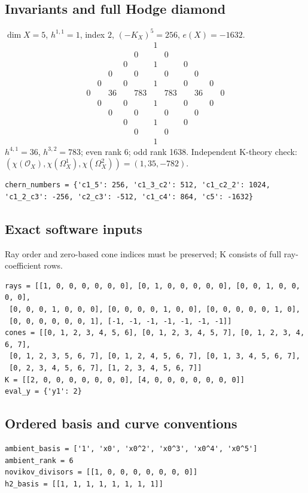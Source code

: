 \documentclass[10pt,a4paper]{article}
\begin{document}
\subsection*{Invariants and full Hodge diamond}
$\dim X=5$, $h^{1,1}=1$, index $2$, $(-K_X)^5=256$, $e(X)=-1632$.
\[\begin{array}{ccccccccccc}&&&&&1&&&&&\\&&&&0&&0&&&&\\&&&0&&1&&0&&&\\&&0&&0&&0&&0&&\\&0&&0&&1&&0&&0&\\0&&36&&783&&783&&36&&0\\&0&&0&&1&&0&&0&\\&&0&&0&&0&&0&&\\&&&0&&1&&0&&&\\&&&&0&&0&&&&\\&&&&&1&&&&&\end{array}\]
$h^{4,1}=36$, $h^{3,2}=783$; even rank 6; odd rank 1638.
Independent K-theory check: $(\chi(\mathcal O_X),\chi(\Omega_X^1),\chi(\Omega_X^2))=(1, 35, -782)$.
\begin{lstlisting}
chern_numbers = {'c1_5': 256, 'c1_3_c2': 512, 'c1_c2_2': 1024, 'c1_2_c3': -256, 'c2_c3': -512, 'c1_c4': 864, 'c5': -1632}
\end{lstlisting}
\subsection*{Exact software inputs}
Ray order and zero-based cone indices must be preserved; K consists of full ray-coefficient rows.
\begin{lstlisting}
rays = [[1, 0, 0, 0, 0, 0, 0], [0, 1, 0, 0, 0, 0, 0], [0, 0, 1, 0, 0, 0, 0],
 [0, 0, 0, 1, 0, 0, 0], [0, 0, 0, 0, 1, 0, 0], [0, 0, 0, 0, 0, 1, 0],
 [0, 0, 0, 0, 0, 0, 1], [-1, -1, -1, -1, -1, -1, -1]]
cones = [[0, 1, 2, 3, 4, 5, 6], [0, 1, 2, 3, 4, 5, 7], [0, 1, 2, 3, 4, 6, 7],
 [0, 1, 2, 3, 5, 6, 7], [0, 1, 2, 4, 5, 6, 7], [0, 1, 3, 4, 5, 6, 7],
 [0, 2, 3, 4, 5, 6, 7], [1, 2, 3, 4, 5, 6, 7]]
K = [[2, 0, 0, 0, 0, 0, 0, 0], [4, 0, 0, 0, 0, 0, 0, 0]]
eval_y = {'y1': 2}
\end{lstlisting}
\subsection*{Ordered basis and curve conventions}
\begin{lstlisting}
ambient_basis = ['1', 'x0', 'x0^2', 'x0^3', 'x0^4', 'x0^5']
ambient_rank = 6
novikov_divisors = [[1, 0, 0, 0, 0, 0, 0, 0]]
h2_basis = [[1, 1, 1, 1, 1, 1, 1, 1]]
\end{lstlisting}
\end{document}
